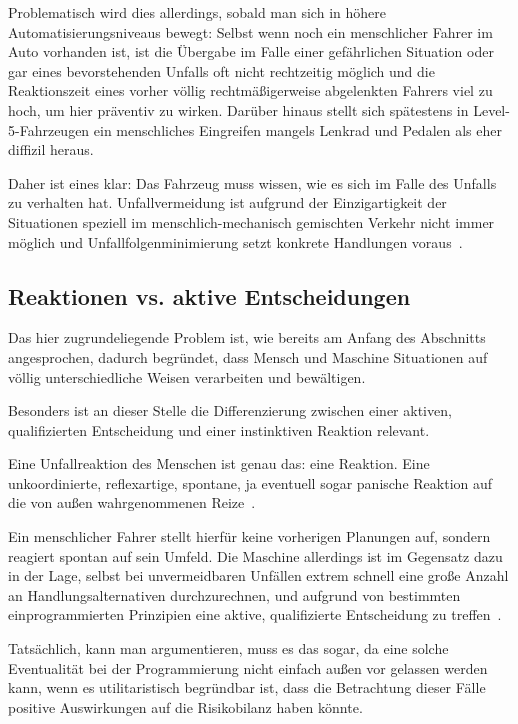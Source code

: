 \documentclass[twocolumn, german]{tum-article}
\begin{document}
Problematisch wird dies allerdings, sobald man sich in höhere Automatisierungsniveaus bewegt:
Selbst wenn noch ein menschlicher Fahrer im Auto vorhanden ist, ist die Übergabe im Falle einer gefährlichen Situation oder gar eines bevorstehenden Unfalls oft nicht rechtzeitig möglich und die Reaktionszeit eines vorher völlig rechtmäßigerweise abgelenkten Fahrers viel zu hoch, um hier präventiv zu wirken.
Darüber hinaus stellt sich spätestens in Level-5-Fahrzeugen ein menschliches Eingreifen mangels Lenkrad und Pedalen als eher diffizil heraus.

Daher ist eines klar: Das Fahrzeug muss wissen, wie es sich im Falle des Unfalls zu verhalten hat.
Unfallvermeidung ist aufgrund der Einzigartigkeit der Situationen speziell im menschlich-mechanisch gemischten Verkehr nicht immer möglich und Unfallfolgenminimierung setzt konkrete Handlungen voraus~\cite[S. 71]{maurer-autonomous}.


\subsection{Reaktionen vs. aktive Entscheidungen}
Das hier zugrundeliegende Problem ist, wie bereits am Anfang des Abschnitts angesprochen, dadurch begründet, dass Mensch und Maschine Situationen auf völlig unterschiedliche Weisen verarbeiten und bewältigen.

Besonders ist an dieser Stelle die Differenzierung zwischen einer aktiven, qualifizierten Entscheidung und einer instinktiven Reaktion relevant.

Eine Unfallreaktion des Menschen ist genau das: eine Reaktion.
Eine unkoordinierte, reflexartige, spontane, ja eventuell sogar panische Reaktion auf die von außen wahrgenommenen Reize~\cite{maurer-autonomous}.

Ein menschlicher Fahrer stellt hierfür keine vorherigen Planungen auf, sondern reagiert spontan auf sein Umfeld.
Die Maschine allerdings ist im Gegensatz dazu in der Lage, selbst bei unvermeidbaren Unfällen extrem schnell eine große Anzahl an Handlungsalternativen durchzurechnen, und aufgrund von bestimmten einprogrammierten Prinzipien eine aktive, qualifizierte Entscheidung zu treffen~\cite[S. 1278]{nyholm-ethics}.

Tatsächlich, kann man argumentieren, muss es das sogar, da eine solche Eventualität bei der Programmierung nicht einfach außen vor gelassen werden kann, wenn es utilitaristisch begründbar ist, dass die Betrachtung dieser Fälle positive Auswirkungen auf die Risikobilanz haben könnte.
\end{document}
